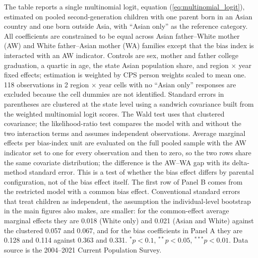 \begin{table}[H]
\begin{threeparttable}
\begin{tablenotes}
\item[1] \scriptsize{The table reports a single multinomial logit, equation (\ref{eq:multinomial_logit}), estimated on pooled second-generation children with one parent born in an Asian country and one born outside Asia, with ``Asian only'' as the reference category. All coefficients are constrained to be equal across Asian father--White mother (AW) and White father--Asian mother (WA) families except that the bias index is interacted with an AW indicator. Controls are sex, mother and father college graduation, a quartic in age, the state Asian population share, and region $\times$ year fixed effects; estimation is weighted by CPS person weights scaled to mean one. 118 observations in 2 region $\times$ year cells with no ``Asian only'' responses are excluded because the cell dummies are not identified. Standard errors in parentheses are clustered at the state level using a sandwich covariance built from the weighted multinomial logit scores. The Wald test uses that clustered covariance; the likelihood-ratio test compares the model with and without the two interaction terms and assumes independent observations. Average marginal effects per bias-index unit are evaluated on the full pooled sample with the AW indicator set to one for every observation and then to zero, so the two rows share the same covariate distribution; the difference is the AW--WA gap with its delta-method standard error. This is a test of whether the bias effect differs by parental configuration, not of the bias effect itself. The first row of Panel B comes from the restricted model with a common bias effect. Conventional standard errors that treat children as independent, the assumption the individual-level bootstrap in the main figures also makes, are smaller: for the common-effect average marginal effects they are 0.018 (White only) and 0.021 (Asian and White) against the clustered 0.057 and 0.067, and for the bias coefficients in Panel A they are 0.128 and 0.114 against 0.363 and 0.331. $^{*}p<0.1$, $^{**}p<0.05$, $^{***}p<0.01$. Data source is the 2004--2021 Current Population Survey.}
\end{tablenotes}
\end{threeparttable}
\end{table}
